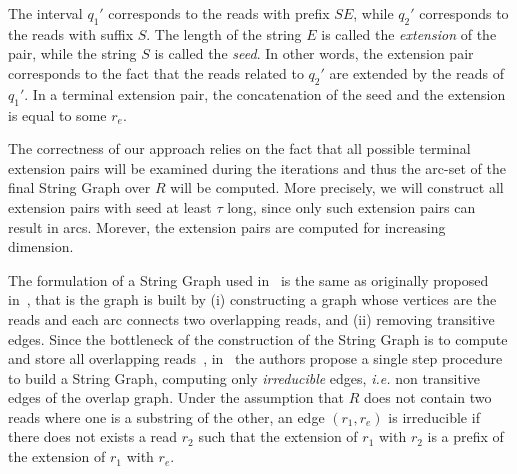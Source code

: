 \documentclass[runningheads,envcountsame,a4paper]{llncs}
\newcommand{\notaestesa}[2]{%
 \marginpar{\color{red!75!black}\textbf{\texttimes}}%
 {\color{red!75!black}%
 [\,\textbullet\,\textsf{\textbf{#1:}} %
 \textsf{\footnotesize#2}\,\textbullet\,]}%
}
\newcommand{\ie}{\textit{i.e.}\xspace}
\newcommand{\wrt}{w.r.t.\xspace}
\begin{document}
The interval $q_{1}'$ corresponds to the reads with prefix $SE$, while $q_{2}'$
corresponds to the reads with suffix $S$.
The length of the string $E$ is called the \emph{extension} of the
pair, while the string $S$ is called the \emph{seed}.
In other words, the extension pair corresponds to the fact that the reads related to $q_{2}'$ are extended by the reads
of $q_{1}'$.
In a terminal extension pair, the concatenation of the seed and the extension is
equal to some $r_{e}$.

The correctness of our approach relies on the fact that all possible
terminal extension pairs will be examined during the iterations and thus
the arc-set of the final String Graph over $R$ will be computed.
More precisely, we will construct all extension pairs with seed at least $\tau$ long, since only such extension pairs can result in arcs.
Morever, the extension pairs are computed for increasing dimension.

The formulation of a String Graph used in~\cite{Simpson2010} is the same as
originally proposed in~\cite{Myers2005}, that is the graph is built by (i)
constructing a graph whose vertices are the reads and each arc connects two overlapping reads, and (ii)
removing transitive edges.
Since the bottleneck of the construction of the String Graph is to compute and store all overlapping reads~\cite{Myesr2005},
in~\cite{Simpson2010} the authors propose a single step procedure to build a
String Graph, computing only \emph{irreducible} edges, \ie non
transitive edges of the overlap graph.
Under the assumption that $R$ does not contain two reads where one is a substring of the other,
an edge $(r_{1}, r_e)$ is irreducible if there does not exists a read $r_{2}$
such that
the extension of $r_{1}$ with $r_2$ is a prefix of
the extension of $r_{1}$ with $r_e$.





\end{document}
